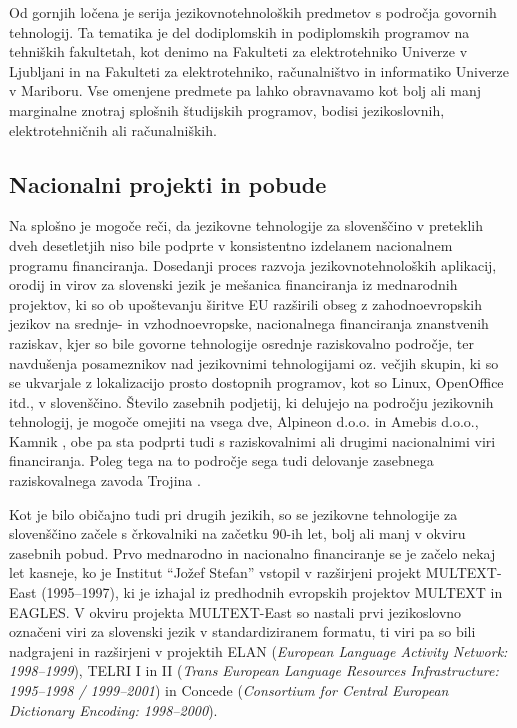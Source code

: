 \begin{multicols}{2}
Od gornjih ločena je serija jezikovnotehnoloških predmetov s področja govornih tehnologij. Ta tematika je del dodiplomskih in podiplomskih programov na tehniških fakultetah, kot denimo na Fakulteti za elektrotehniko Univerze v Ljubljani in na Fakulteti za elektrotehniko, računalništvo in informatiko Univerze v Mariboru. Vse omenjene predmete pa lahko obravnavamo kot bolj ali manj marginalne znotraj splošnih študijskih programov, bodisi jezikoslovnih, elektrotehničnih ali računalniških.

\subsection{Nacionalni projekti in pobude}

Na splošno je mogoče reči, da jezikovne tehnologije za slovenščino v preteklih dveh desetletjih niso bile podprte v konsistentno izdelanem nacionalnem programu financiranja. Dosedanji proces razvoja jezikovnotehnoloških aplikacij, orodij in virov za slovenski jezik je mešanica financiranja iz mednarodnih projektov,  ki so ob upoštevanju širitve EU razširili obseg z zahodnoevropskih jezikov na srednje- in vzhodnoevropske, nacionalnega financiranja znanstvenih raziskav, kjer so bile govorne tehnologije osrednje raziskovalno področje, ter navdušenja posameznikov nad jezikovnimi tehnologijami oz. večjih skupin, ki so se ukvarjale z lokalizacijo prosto dostopnih programov, kot so Linux, OpenOffice itd., v slovenščino.  Število zasebnih podjetij, ki delujejo na področju jezikovnih tehnologij, je mogoče omejiti na vsega dve, Alpineon d.o.o. \cite{Alp3} in Amebis d.o.o., Kamnik \cite{Amb6}, obe pa sta podprti tudi s raziskovalnimi ali drugimi nacionalnimi viri financiranja. Poleg tega na to področje sega tudi delovanje zasebnega raziskovalnega zavoda Trojina \cite{Troj1}. 

Kot je bilo običajno tudi pri drugih jezikih, so se jezikovne tehnologije za slovenščino začele s črkovalniki na začetku 90-ih let, bolj ali manj v okviru zasebnih pobud. Prvo mednarodno in nacionalno financiranje se je začelo nekaj let kasneje, ko je Institut “Jožef Stefan” vstopil v razširjeni projekt MULTEXT-East (1995--1997), ki je izhajal iz predhodnih evropskih projektov MULTEXT in EAGLES. V okviru projekta MULTEXT-East so nastali prvi jezikoslovno označeni viri za slovenski jezik v standardiziranem formatu, ti viri pa so bili nadgrajeni in razširjeni v projektih ELAN (\textit{European Language Activity Network: 1998--1999}), TELRI I in II (\textit{Trans European Language Resources Infrastructure: 1995--1998 / 1999--2001}) in Concede (\textit{Consortium for Central European Dictionary Encoding: 1998--2000}).


\end{multicols}

